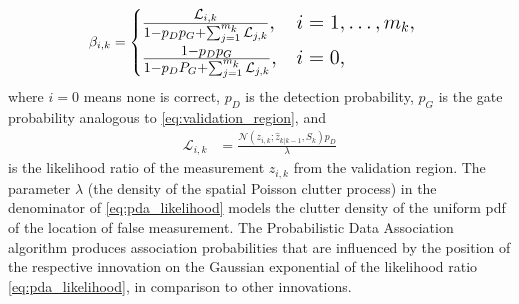 \begin{align}
    \beta_{i,k} &=
    \begingroup
    \Large
    \begin{cases}
        \frac{\mathcal{L}_{i,k}}{1-p_D p_G + \sum_{j=1}^{m_k}\mathcal{L}_{j,k}}, & i=1, \dots, m_k, \\
        \frac{1-p_D p_G}{1-p_D P_G + \sum_{j=1}^{m_k}\mathcal{L}_{j,k}}, & i =0,
    \end{cases}
    \label{eq:pda_beta}
    \endgroup
\end{align}
where $i=0$ means none is correct, $p_D$ is the detection probability, $p_G$ is the gate probability analogous to \eqref{eq:validation_region}, and
\begin{align}
    \mathcal{L}_{i,k} &= \frac{\mathcal{N}(z_{i,k};\hat{z}_{k|k-1}, S_k) p_D}{\lambda} \label{eq:pda_likelihood}
\end{align}
is the likelihood ratio of the measurement $z_{i,k}$ from the validation region. The parameter $\lambda$ (the density
of the spatial Poisson clutter process) in the denominator of \eqref{eq:pda_likelihood} models the clutter density of
the uniform pdf of the location of false measurement. The Probabilistic Data Association algorithm produces association probabilities that are influenced by the position of the respective innovation on the Gaussian exponential of the likelihood ratio \eqref{eq:pda_likelihood}, in comparison to other innovations.

